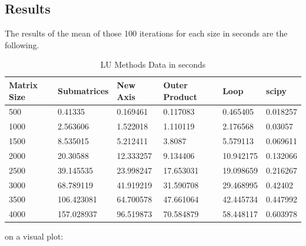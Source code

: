 \subsection{Results}
The results of the mean of those 100 iterations for each size in seconds are the following. 
\begin{table}[H]
    \centering
    \begin{tabular}{|l|l|l|l|l|l|}
    \hline
        \textbf{Matrix Size} & \textbf{Submatrices} & \textbf{New Axis} & \textbf{Outer Product} & \textbf{Loop} & \textbf{scipy} \\ \hline
        500 & 0.41335 & 0.169461 & 0.117083 & 0.465405 & 0.018257 \\ \hline
        1000 & 2.563606 & 1.522018 & 1.110119 & 2.176568 & 0.03057 \\ \hline
        1500 & 8.535015 & 5.212411 & 3.8087 & 5.579113 & 0.069611 \\ \hline
        2000 & 20.30588 & 12.333257 & 9.134406 & 10.942175 & 0.132066 \\ \hline
        2500 & 39.145535 & 23.998247 & 17.653031 & 19.098659 & 0.216267 \\ \hline
        3000 & 68.789119 & 41.919219 & 31.590708 & 29.468995 & 0.42402 \\ \hline
        3500 & 106.423081 & 64.700578 & 47.661064 & 42.445734 & 0.447992 \\ \hline
        4000 & 157.028937 & 96.519873 & 70.584879 & 58.448117 & 0.603978 \\ \hline
    \end{tabular}
    \caption{LU Methods Data in seconds}
\end{table}

on a visual plot:

